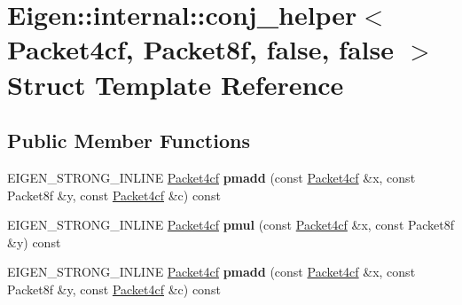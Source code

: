 \hypertarget{struct_eigen_1_1internal_1_1conj__helper_3_01_packet4cf_00_01_packet8f_00_01false_00_01false_01_4}{}\section{Eigen\+:\+:internal\+:\+:conj\+\_\+helper$<$ Packet4cf, Packet8f, false, false $>$ Struct Template Reference}
\label{struct_eigen_1_1internal_1_1conj__helper_3_01_packet4cf_00_01_packet8f_00_01false_00_01false_01_4}
\subsection*{Public Member Functions}
\begin{DoxyCompactItemize}
\item 
\mbox{\label{struct_eigen_1_1internal_1_1conj__helper_3_01_packet4cf_00_01_packet8f_00_01false_00_01false_01_4_ab0be06b86b24a87a5cb629893f20a9e0}} 
E\+I\+G\+E\+N\+\_\+\+S\+T\+R\+O\+N\+G\+\_\+\+I\+N\+L\+I\+NE \hyperlink{struct_eigen_1_1internal_1_1_packet4cf}{Packet4cf} {\bfseries pmadd} (const \hyperlink{struct_eigen_1_1internal_1_1_packet4cf}{Packet4cf} \&x, const Packet8f \&y, const \hyperlink{struct_eigen_1_1internal_1_1_packet4cf}{Packet4cf} \&c) const
\item 
\mbox{\label{struct_eigen_1_1internal_1_1conj__helper_3_01_packet4cf_00_01_packet8f_00_01false_00_01false_01_4_a2f0554d7810c3b59f9c935e08159331e}} 
E\+I\+G\+E\+N\+\_\+\+S\+T\+R\+O\+N\+G\+\_\+\+I\+N\+L\+I\+NE \hyperlink{struct_eigen_1_1internal_1_1_packet4cf}{Packet4cf} {\bfseries pmul} (const \hyperlink{struct_eigen_1_1internal_1_1_packet4cf}{Packet4cf} \&x, const Packet8f \&y) const
\item 
\mbox{\label{struct_eigen_1_1internal_1_1conj__helper_3_01_packet4cf_00_01_packet8f_00_01false_00_01false_01_4_ab0be06b86b24a87a5cb629893f20a9e0}} 
E\+I\+G\+E\+N\+\_\+\+S\+T\+R\+O\+N\+G\+\_\+\+I\+N\+L\+I\+NE \hyperlink{struct_eigen_1_1internal_1_1_packet4cf}{Packet4cf} {\bfseries pmadd} (const \hyperlink{struct_eigen_1_1internal_1_1_packet4cf}{Packet4cf} \&x, const Packet8f \&y, const \hyperlink{struct_eigen_1_1internal_1_1_packet4cf}{Packet4cf} \&c) const

\end{DoxyCompactItemize}
